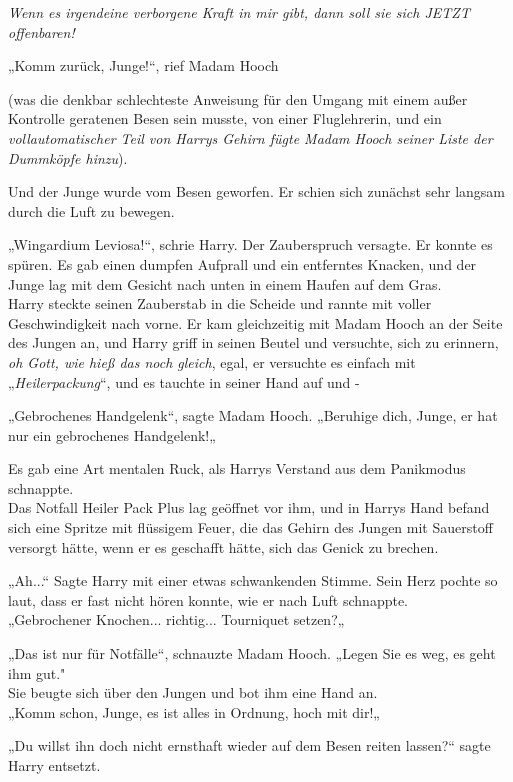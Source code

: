 {\emph{Wenn es irgendeine verborgene Kraft in mir gibt, dann soll sie sich JETZT offenbaren!}

„Komm zurück, Junge!“, rief Madam Hooch

(was die denkbar schlechteste Anweisung für den Umgang mit einem außer Kontrolle geratenen Besen sein musste, von einer Fluglehrerin, und ein \emph{vollautomatischer Teil von Harrys Gehirn fügte Madam Hooch seiner Liste der Dummköpfe hinzu}).

Und der Junge wurde vom Besen geworfen. Er schien sich zunächst sehr langsam durch die Luft zu bewegen.

„Wingardium Leviosa!“, schrie Harry. Der Zauberspruch versagte. Er konnte es spüren. Es gab einen dumpfen Aufprall und ein entferntes Knacken, und der Junge lag mit dem Gesicht nach unten in einem Haufen auf dem Gras.\\ Harry steckte seinen Zauberstab in die Scheide und rannte mit voller Geschwindigkeit nach vorne. Er kam gleichzeitig mit Madam Hooch an der Seite des Jungen an, und Harry griff in seinen Beutel und versuchte, sich zu erinnern, \emph{oh Gott, wie hieß das noch gleich}, egal, er versuchte es einfach mit\\ „\emph{Heilerpackung}“, und es tauchte in seiner Hand auf und -

„Gebrochenes Handgelenk“, sagte Madam Hooch. „Beruhige dich, Junge, er hat nur ein gebrochenes Handgelenk!„

Es gab eine Art mentalen Ruck, als Harrys Verstand aus dem Panikmodus schnappte.\\ Das Notfall Heiler Pack Plus lag geöffnet vor ihm, und in Harrys Hand befand sich eine Spritze mit flüssigem Feuer, die das Gehirn des Jungen mit Sauerstoff versorgt hätte, wenn er es geschafft hätte, sich das Genick zu brechen.

„Ah...“ Sagte Harry mit einer etwas schwankenden Stimme. Sein Herz pochte so laut, dass er fast nicht hören konnte, wie er nach Luft schnappte.\\ „Gebrochener Knochen... richtig... Tourniquet setzen?„

„Das ist nur für Notfälle“, schnauzte Madam Hooch. „Legen Sie es weg, es geht ihm gut."\\ Sie beugte sich über den Jungen und bot ihm eine Hand an.\\ „Komm schon, Junge, es ist alles in Ordnung, hoch mit dir!„

„Du willst ihn doch nicht ernsthaft wieder auf dem Besen reiten lassen?“ sagte Harry entsetzt.

}
